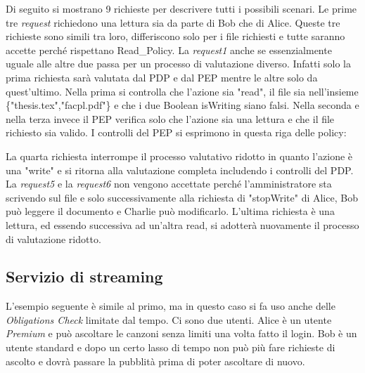 
Di seguito si mostrano 9 richieste per descrivere tutti i possibili scenari.
Le prime tre \emph{request} richiedono una lettura sia da parte di Bob che di Alice. Queste tre richieste sono simili tra loro,
differiscono solo per i file richiesti e tutte saranno accette perché rispettano Read\_Policy. La \emph{request1} anche
se essenzialmente uguale alle altre due passa per un processo di valutazione diverso. Infatti solo la prima richiesta
sarà valutata dal \ac{PDP} e dal \ac{PEP} mentre le altre solo da quest'ultimo. Nella prima si controlla che l'azione sia "read",
il file sia nell'insieme \{"thesis.tex","facpl.pdf"\} e che i due Boolean isWriting siano falsi. Nella seconda e nella terza
invece il \ac{PEP} verifica solo che l'azione sia una lettura e che il file richiesto sia valido.
I controlli del \ac{PEP} si esprimono in questa riga delle policy:


La quarta richiesta interrompe il processo valutativo ridotto in quanto l'azione è una "write" e si ritorna alla valutazione
completa includendo i controlli del \ac{PDP}. La \emph{request5} e la \emph{request6} non vengono accettate perché l'amministratore
sta scrivendo sul file e solo successivamente alla richiesta di "stopWrite" di Alice, Bob può leggere il documento e Charlie può modificarlo.
L'ultima richiesta è una lettura, ed essendo successiva ad un'altra read, si adotterà nuovamente il processo di valutazione ridotto.

\subsection{Servizio di streaming}
\label{sub:Stream_Code_Sec}
L'esempio seguente è simile al primo, ma in questo caso si fa uso anche delle \emph{Obligations Check} limitate dal tempo.
Ci sono due utenti. Alice è un utente \emph{Premium} e può ascoltare le canzoni senza limiti una volta fatto il login. Bob
è un utente standard e dopo un certo lasso di tempo non può più fare richieste di ascolto e dovrà passare la pubblità prima
di poter ascoltare di nuovo.


